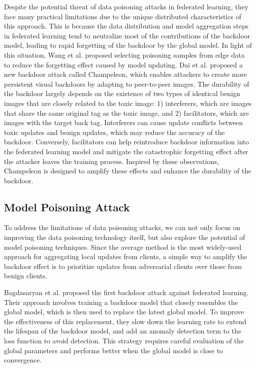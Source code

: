 \documentclass[conference]{IEEEtran}
\begin{document}
Despite the potential threat of data poisoning attacks in federated learning,
they face many practical limitations due to the unique distributed characteristics of this approach\cite{b25}.
This is because the data distribution and model aggregation steps in federated learning tend to neutralize
most of the contributions of the backdoor model, leading to rapid forgetting of the backdoor by the global model.
In light of this situation, Wang et al.\cite{b25} proposed selecting poisoning samples from edge data to reduce the
forgetting effect caused by model updating. Dai et al.\cite{b64} proposed a new backdoor attack called Champeleon, 
which enables attackers to create more persistent visual backdoors by adapting 
to peer-to-peer images. The durability of the backdoor largely depends 
on the existence of two types of identical benign images that are closely 
related to the toxic image: 1) interferers, which are images that share 
the same original tag as the toxic image, and 2) facilitators, which are 
images with the target back tag. Interferers can cause update conflicts 
between toxic updates and benign updates, which may reduce the accuracy of 
the backdoor. Conversely, facilitators can help reintroduce backdoor 
information into the federated learning model and mitigate the catastrophic 
forgetting effect after the attacker leaves the training process. Inspired by 
these observations, Champeleon is designed to amplify these effects and enhance 
the durability of the backdoor.

\subsection{Model Poisoning Attack}
To address the limitations of data poisoning attacks, we can not only focus on
improving the data poisoning technology itself, but also explore the potential
of model poisoning techniques. Since the average method is the most widely-used
approach for aggregating local updates from clients, a simple way to amplify
the backdoor effect is to prioritize updates from adversarial clients over
those from benign clients.

Bagdasaryan et al.\cite{b24} proposed the first backdoor attack against federated learning.
Their approach involves training a backdoor model that closely resembles the global
model, which is then used to replace the latest global model.
To improve the effectiveness of this replacement, they slow down
the learning rate to extend the lifespan of the backdoor model, and add an
anomaly detection term to the loss function to avoid detection. This
strategy requires careful evaluation of the global parameters and performs
better when the global model is close to convergence.
\end{document}
